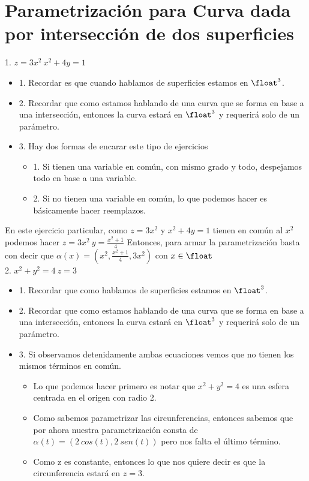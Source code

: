 \documentclass[10pt,a4paper]{article}
\begin{document}
\section*{Parametrización para Curva dada por intersección de dos superficies}
1. $z = 3x^{2} \ x^{2} + 4y = 1$ 
\begin{itemize}
    \item 1. Recordar es que cuando hablamos de superficies estamos en $\float^{3}$. 
    \item 2. Recordar que como estamos hablando de una curva que se forma en base a una intersección, entonces la curva estará en $\float^{3}$ y requerirá solo de un parámetro.
    \item 3. Hay dos formas de encarar este tipo de ejercicios 
    \begin{itemize}
        \item 1. Si tienen una variable en común, con mismo grado y todo, despejamos todo en base a una variable.
        \item 2. Si no tienen una variable en común, lo que podemos hacer es básicamente hacer reemplazos.
    \end{itemize}
\end{itemize}
En este ejercicio particular, como $z = 3x^{2}$ y $x^{2} + 4y = 1$ tienen en común al $x^{2}$ podemos hacer $z = 3x^{2} \ y = \frac{x^{2} + 1}{4}$
Entonces, para armar la parametrización basta con decir que $ \alpha(x) = (x^{2}, \frac{x^{2} + 1}{4}, 3x^{2})$ con $x \in \float $ \\
2. $x^{2} + y^{2} = 4 \ z = 3$
\begin{itemize}
    \item 1. Recordar que como hablamos de superficies estamos en $\float^{3}$.
    \item 2. Recordar que como estamos hablando de una curva que se forma en base a una intersección, entonces la curva estará en $\float^{3}$ y requerirá solo de un parámetro.
    \item 3. Si observamos detenidamente ambas ecuaciones vemos que no tienen los mismos términos en común.
    \begin{itemize}
        \item Lo que podemos hacer primero es notar que $x^{2} + y^{2} = 4$ es una esfera centrada en el origen con radio 2. 
        \item Como sabemos parametrizar las circunferencias, entonces sabemos que por ahora nuestra parametrización consta de $\alpha(t) = (2 \ cos(t), 2 \ sen(t))$ pero nos falta el último término.
        \item Como z es constante, entonces lo que nos quiere decir es que la circunferencia estará en $z = 3$.
    \end{itemize}
\end{itemize} 
\end{document}
